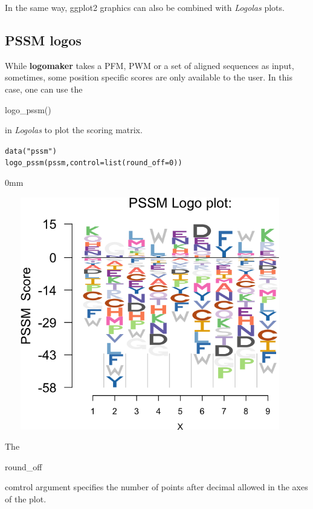 \documentclass[12pt]{article}\usepackage[]{graphicx}\usepackage[usenames,dvipsnames]{color}
\newcommand{\hlnum}[1]{\textcolor[rgb]{0.816,0.125,0.439}{#1}}%
\newcommand{\hlstr}[1]{\textcolor[rgb]{0.251,0.627,0.251}{#1}}%
\newcommand{\hlstd}[1]{\textcolor[rgb]{0.251,0.251,0.251}{#1}}%
\newcommand{\hlkwc}[1]{\textcolor[rgb]{0.251,0.251,0.251}{#1}}%
\newcommand{\hlkwd}[1]{\textcolor[rgb]{0.878,0.439,0.125}{#1}}%
\newenvironment{knitrout}{}{} %
\newcommand{\Logolas}{\textit{Logolas}}
\begin{document}
In the same way, ggplot2 graphics can also be combined with \Logolas{} plots.

\subsection {PSSM logos}

While \textbf{logomaker} takes a PFM, PWM or a set of aligned sequences as input, sometimes, some position specific scores are only available to the user. In this case, one can use the \begin{verb} logo_pssm() \end{verb}
in \Logolas{} to plot the scoring matrix.

\begin{knitrout}
\color{fgcolor}\begin{kframe}
\begin{alltt}
\hlkwd{data}\hlstd{(}\hlstr{"pssm"}\hlstd{)}
\hlkwd{logo_pssm}\hlstd{(pssm,} \hlkwc{control} \hlstd{=} \hlkwd{list}\hlstd{(}\hlkwc{round_off} \hlstd{=} \hlnum{0}\hlstd{))}
\end{alltt}
\end{kframe}\begin{adjustwidth}{\fltoffset}{0mm}

\includegraphics[width=5in,height=4in]{figure/pssm-1} \hfill{}

\end{adjustwidth}
\end{knitrout}

The \begin{verb} round_off \end{verb} comtrol argument specifies the number of points after decimal allowed in the axes of the plot.
\end{document}
